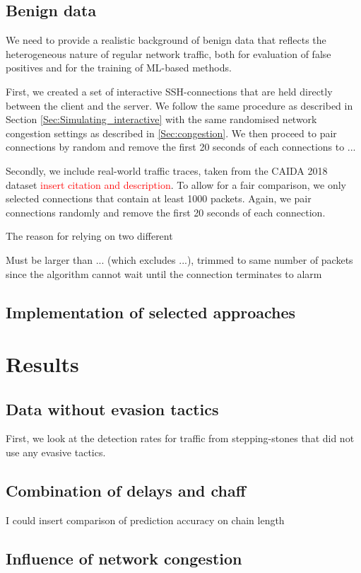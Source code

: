 \documentclass[conference]{IEEEtran}\usepackage[]{graphicx}\usepackage[]{color}
\begin{document}
 
\subsection{Benign data}

We need to provide a realistic background of benign data that reflects the heterogeneous nature of regular network traffic, both for evaluation of false positives and for the training of ML-based methods.

First, we created a set of interactive SSH-connections that are held directly between the client and the server. We follow the same procedure as described in Section \ref{Sec:Simulating_interactive} with the same randomised network congestion settings as described in \ref{Sec:congestion}. We then proceed to pair connections by random and remove the first 20 seconds of each connections to ...

Secondly, we include real-world traffic traces, taken from the CAIDA 2018 dataset \textcolor{red}{insert citation and description}. To allow for a fair comparison, we only selected connections that contain at least 1000 packets. Again, we pair connections randomly and remove the first 20 seconds of each connection. 


The reason for relying on two different 

Must be larger than ... (which excludes ...), trimmed to same number of packets since the algorithm cannot wait until the connection terminates to alarm

\subsection{Implementation of selected approaches}


\section{Results}


\subsection{Data without evasion tactics}

First, we look at the detection rates for traffic from stepping-stones that did not use any evasive tactics. 


\subsection{Combination of delays and chaff}




I could insert comparison of prediction accuracy on chain length


\subsection{Influence of network congestion}






\appendix




 
\end{document}

